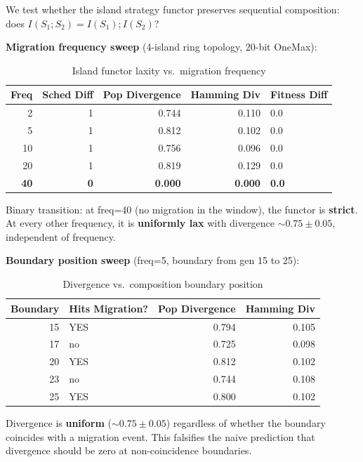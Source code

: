\documentclass[10pt]{article}
\begin{document}
We test whether the island strategy functor preserves sequential composition: does $I(S_1 ; S_2) = I(S_1) ; I(S_2)$?

\textbf{Migration frequency sweep} (4-island ring topology, 20-bit OneMax):

\begin{table}[ht]
\centering
\caption{Island functor laxity vs.\ migration frequency}
\label{tab:laxity}
\begin{tabular}{@{}rrrrl@{}}
\toprule
\textbf{Freq} & \textbf{Sched Diff} & \textbf{Pop Divergence} & \textbf{Hamming Div} & \textbf{Fitness Diff} \\
\midrule
2  & 1 & 0.744          & 0.110 & 0.0 \\
5  & 1 & 0.812          & 0.102 & 0.0 \\
10 & 1 & 0.756          & 0.096 & 0.0 \\
20 & 1 & 0.819          & 0.129 & 0.0 \\
\textbf{40} & \textbf{0} & \textbf{0.000} & \textbf{0.000} & \textbf{0.0} \\
\bottomrule
\end{tabular}
\end{table}

Binary transition: at freq=40 (no migration in the window), the functor is \textbf{strict}. At every other frequency, it is \textbf{uniformly lax} with divergence ${\sim}0.75 \pm 0.05$, independent of frequency.

\textbf{Boundary position sweep} (freq=5, boundary from gen 15 to 25):

\begin{table}[ht]
\centering
\caption{Divergence vs.\ composition boundary position}
\label{tab:boundary}
\begin{tabular}{@{}rlrr@{}}
\toprule
\textbf{Boundary} & \textbf{Hits Migration?} & \textbf{Pop Divergence} & \textbf{Hamming Div} \\
\midrule
15 & YES & 0.794 & 0.105 \\
17 & no  & 0.725 & 0.098 \\
20 & YES & 0.812 & 0.102 \\
23 & no  & 0.744 & 0.108 \\
25 & YES & 0.800 & 0.102 \\
\bottomrule
\end{tabular}
\end{table}

Divergence is \textbf{uniform} (${\sim}0.75 \pm 0.05$) regardless of whether the boundary coincides with a migration event. This falsifies the naive prediction that divergence should be zero at non-coincidence boundaries.
\end{document}
